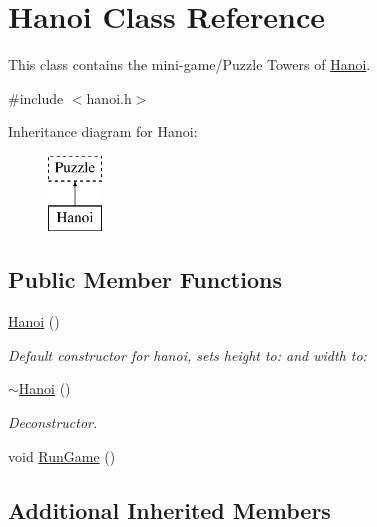 \hypertarget{classHanoi}{\section{Hanoi Class Reference}
\label{classHanoi}
}


This class contains the mini-\/game/\-Puzzle Towers of \hyperlink{classHanoi}{Hanoi}.  




{\ttfamily \#include $<$hanoi.\-h$>$}

Inheritance diagram for Hanoi\-:\begin{figure}[H]
\begin{center}
\leavevmode
\includegraphics[height=2.000000cm]{classHanoi}
\end{center}
\end{figure}
\subsection*{Public Member Functions}
\begin{DoxyCompactItemize}
\item 
\hyperlink{classHanoi_a2af453ec21277f20edc002be08f22346}{Hanoi} ()
\begin{DoxyCompactList}\small\item\em Default constructor for hanoi, sets height to\-: and width to\-: \end{DoxyCompactList}\item 
\hypertarget{classHanoi_a59760291bfeda65330ff53c429a4e55b}{\hyperlink{classHanoi_a59760291bfeda65330ff53c429a4e55b}{$\sim$\-Hanoi} ()}\label{classHanoi_a59760291bfeda65330ff53c429a4e55b}

\begin{DoxyCompactList}\small\item\em Deconstructor. \end{DoxyCompactList}\item 
void \hyperlink{classHanoi_a2032169272e11d26ce253e2b264b9f31}{Run\-Game} ()
\end{DoxyCompactItemize}
\subsection*{Additional Inherited Members}


